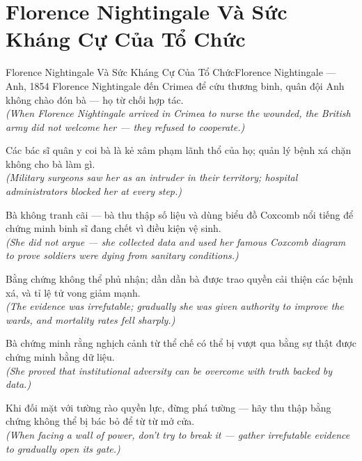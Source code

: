 \section{Florence Nightingale Và Sức Kháng Cự Của Tổ Chức}
\begin{truyen}{Florence Nightingale Và Sức Kháng Cự Của Tổ Chức}{Florence Nightingale --- Anh, 1854}
 Florence Nightingale đến Crimea để cứu thương binh, quân đội Anh không chào đón bà --- họ từ chối hợp tác.\\[4pt]
\textit{(When Florence Nightingale arrived in Crimea to nurse the wounded, the British army did not welcome her --- they refused to cooperate.)}

Các bác sĩ quân y coi bà là kẻ xâm phạm lãnh thổ của họ; quản lý bệnh xá chặn không cho bà làm gì.\\[4pt]
\textit{(Military surgeons saw her as an intruder in their territory; hospital administrators blocked her at every step.)}

Bà không tranh cãi --- bà thu thập số liệu và dùng biểu đồ Coxcomb nổi tiếng để chứng minh binh sĩ đang chết vì điều kiện vệ sinh.\\[4pt]
\textit{(She did not argue --- she collected data and used her famous Coxcomb diagram to prove soldiers were dying from sanitary conditions.)}

Bằng chứng không thể phủ nhận; dần dần bà được trao quyền cải thiện các bệnh xá, và tỉ lệ tử vong giảm mạnh.\\[4pt]
\textit{(The evidence was irrefutable; gradually she was given authority to improve the wards, and mortality rates fell sharply.)}

Bà chứng minh rằng nghịch cảnh từ thể chế có thể bị vượt qua bằng sự thật được chứng minh bằng dữ liệu.\\[4pt]
\textit{(She proved that institutional adversity can be overcome with truth backed by data.)}

\end{truyen}
\begin{baihoc}
  Khi đối mặt với tường rào quyền lực, đừng phá tường --- hãy thu thập bằng chứng không thể bị bác bỏ để từ từ mở cửa.\\[4pt]
  \textit{(When facing a wall of power, don't try to break it --- gather irrefutable evidence to gradually open its gate.)}
\end{baihoc}
